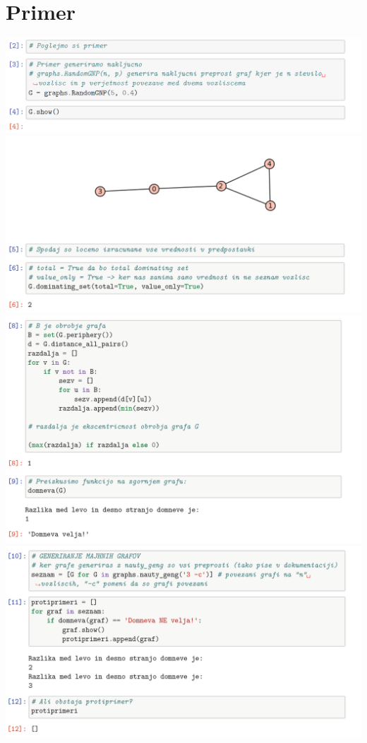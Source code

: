 \documentclass[10pt, a4paper]{article}
\begin{document}
\pagebreak

\section{Primer}

\begin{center}
\includegraphics[width=16cm]{primer_1}
\includegraphics[width=16cm]{primer_2}
\includegraphics[width=16cm]{primer_3}
\includegraphics[width=16cm]{primer_4}
\end{center}
\end{document}
